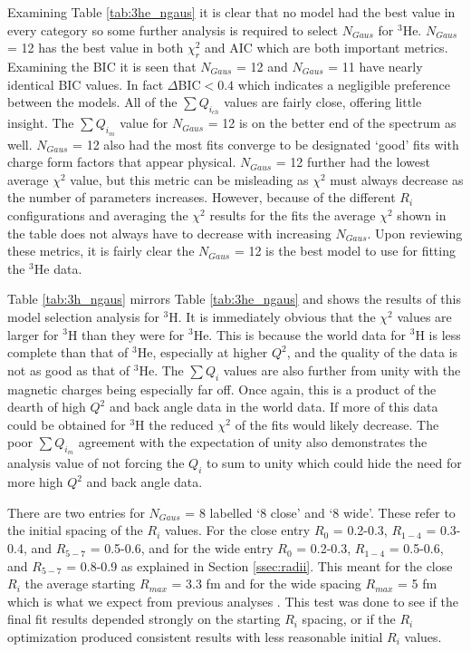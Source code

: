 Examining Table \ref{tab:3he_ngaus} it is clear that no model had the best value in every category so some further analysis is required to select $N_{Gaus}$ for $^3$He. $N_{Gaus}$ = 12 has the best value in both $\chi^2_r$ and AIC which are both important metrics. Examining the BIC it is seen that $N_{Gaus}$ = 12 and $N_{Gaus}$ = 11 have nearly identical BIC values. In fact $\Delta$BIC$<0.4$ which indicates a negligible preference between the models. All of the $\sum Q_{i_{ch}}$ values are fairly close, offering little insight. The $\sum Q_{i_{m}}$ value for $N_{Gaus}$ = 12 is on the better end of the spectrum as well. $N_{Gaus}$ = 12 also had the most fits converge to be designated `good' fits with charge form factors that appear physical. $N_{Gaus}$ = 12 further had the lowest average $\chi^2$ value, but this metric can be misleading as $\chi^2$ must always decrease as the number of parameters increases. However, because of the different $R_i$ configurations and averaging the $\chi^2$ results for the fits the average $\chi^2$ shown in the table does not always have to decrease with increasing $N_{Gaus}$. Upon reviewing these metrics, it is fairly clear the $N_{Gaus}$ = 12 is the best model to use for fitting the $^3$He data.

Table \ref{tab:3h_ngaus} mirrors Table \ref{tab:3he_ngaus} and shows the results of this model selection analysis for $^3$H. It is immediately obvious that the $\chi^2$ values are larger for $^3$H than they were for $^3$He. This is because the world data for $^3$H is less complete than that of $^3$He, especially at higher $Q^2$, and the quality of the data is not as good as that of $^3$He. The $\sum Q_i$ values are also further from unity with the magnetic charges being especially far off. Once again, this is a product of the dearth of high $Q^2$ and back angle data in the world data. If more of this data could be obtained for $^3$H the reduced $\chi^2$ of the fits would likely decrease. The poor $\sum Q_{i_{m}}$ agreement with the expectation of unity also demonstrates the analysis value of not forcing the $Q_i$ to sum to unity which could hide the need for more high $Q^2$ and back angle data.%

There are two entries for $N_{Gaus}$ = 8 labelled `8 close' and `8 wide'. These refer to the initial spacing of the $R_i$ values. For the close entry $R_0$ = 0.2-0.3, $R_{1-4}$ = 0.3-0.4, and $R_{5-7}$ = 0.5-0.6, and for the wide entry $R_0$ = 0.2-0.3, $R_{1-4}$ = 0.5-0.6, and $R_{5-7}$ = 0.8-0.9 as explained in Section \ref{ssec:radii}. This meant for the close $R_i$ the average starting $R_{max}$ = 3.3 fm and for the wide spacing $R_{max}$ = 5 fm which is what we expect from previous analyses \cite{Article:Amroun}. This test was done to see if the final fit results depended strongly on the starting $R_i$ spacing, or if the $R_i$ optimization produced consistent results with less reasonable initial $R_i$ values.

